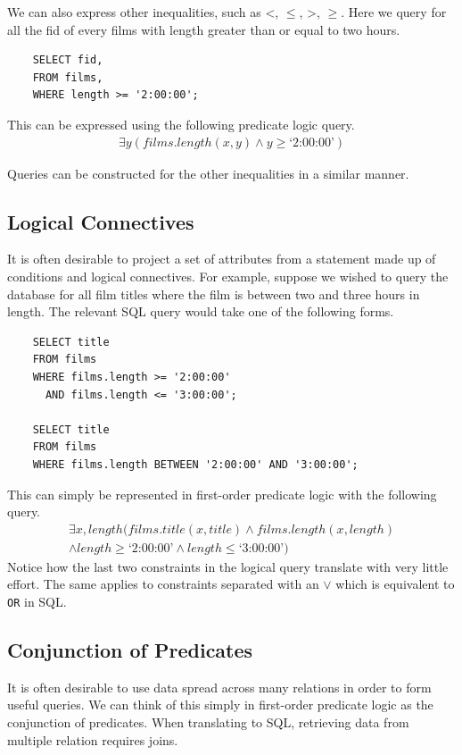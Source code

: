\documentclass[a4paper, 11pt]{article}
\begin{document}
    We can also express other inequalities, such as <, $\le$, >, $\ge$.
    Here we query for all the fid of every films with length greater than or
    equal to two hours.
    \begin{verbatim}
    SELECT fid,
    FROM films,
    WHERE length >= '2:00:00';
    \end{verbatim}
    This can be expressed using the following predicate logic query.
    \begin{gather}
      \exists y(films.length(x, y) \land y \ge \text{`2:00:00'}) \label{where5}
    \end{gather}

    Queries can be constructed for the other inequalities in a similar manner.

  \subsection{Logical Connectives}
    It is often desirable to project a set of attributes from a statement
    made up of conditions and logical connectives. For example, suppose we
    wished to query the database for all film titles where the film is between
    two and three hours in length. The relevant SQL query would take one of
    the following forms.
    \begin{verbatim}
    SELECT title
    FROM films
    WHERE films.length >= '2:00:00'
      AND films.length <= '3:00:00';

    SELECT title
    FROM films
    WHERE films.length BETWEEN '2:00:00' AND '3:00:00';
    \end{verbatim}
    This can simply be represented in first-order predicate logic with the
    following query.
    \begin{multline}
      \exists x, length(films.title(x, title) \land films.length(x,
      length)\\
      \land length \ge \text{`2:00:00'} \land length \le \text{`3:00:00'})
    \end{multline}
    Notice how the last two constraints in the logical query translate
    with very little effort. The same applies to constraints separated with
    an $\lor$ which is equivalent to \texttt{OR} in SQL.

  \subsection{Conjunction of Predicates}
    \label{sec:joins}
    It is often desirable to use data spread across many relations in order to
    form useful queries. We can think of this simply in first-order predicate
    logic as the conjunction of predicates. When translating to SQL, retrieving
    data from multiple relation requires joins.
\end{document}
